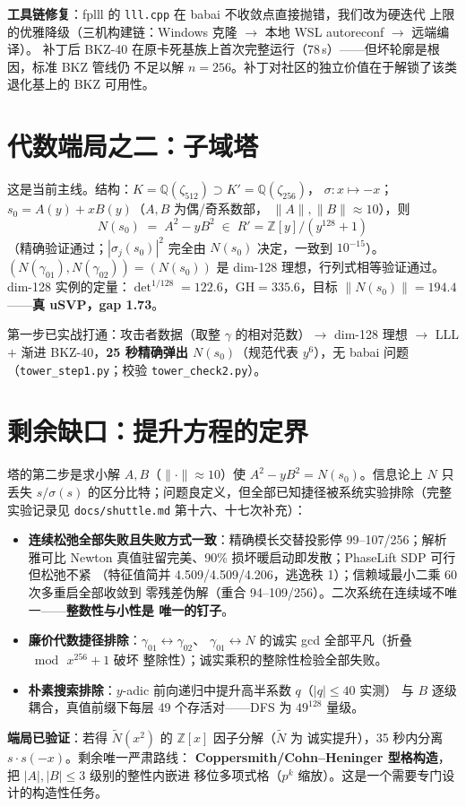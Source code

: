 \documentclass[UTF8,11pt,a4paper]{ctexart}
\newcommand{\code}[1]{\texttt{\small #1}}
\begin{document}
\textbf{工具链修复}：fplll 的 \code{lll.cpp} 在 babai 不收敛点直接抛错，我们改为硬迭代
上限的优雅降级（三机构建链：Windows 克隆 $\to$ 本地 WSL autoreconf $\to$ 远端编译）。
补丁后 BKZ-40 在原卡死基族上首次完整运行（78\,s）——但坏轮廓是根因，标准 BKZ 管线仍
不足以解 $n = 256$。补丁对社区的独立价值在于解锁了该类退化基上的 BKZ 可用性。

\section{代数端局之二：子域塔}

这是当前主线。结构：$K = \mathbb{Q}(\zeta_{512}) \supset K' = \mathbb{Q}(\zeta_{256})$，
$\sigma\colon x \mapsto -x$；$s_0 = A(y) + x B(y)$（$A, B$ 为偶/奇系数部，
$\|A\|, \|B\| \approx 10$），则
\[
N(s_0) \;=\; A^2 - y B^2 \;\in\; R' = \mathbb{Z}[y]/(y^{128}+1)
\]
（精确验证通过；$|\sigma_j(s_0)|^2$ 完全由 $N(s_0)$ 决定，一致到 $10^{-15}$）。
$(N(\gamma_{01}), N(\gamma_{02})) = (N(s_0))$ 是 dim-128 理想，行列式相等验证通过。
dim-128 实例的定量：$\det^{1/128} = 122.6$，$\mathrm{GH} = 335.6$，目标
$\|N(s_0)\| = 194.4$——\textbf{真 uSVP，gap 1.73}。

第一步已实战打通：攻击者数据（取整 $\gamma$ 的相对范数）$\to$ dim-128 理想 $\to$
LLL $+$ 渐进 BKZ-40，\textbf{25 秒精确弹出 $N(s_0)$}（规范代表 $y^6$），无 babai 问题
（\code{tower\_step1.py}；校验 \code{tower\_check2.py}）。

\section{剩余缺口：提升方程的定界}

塔的第二步是求小解 $A, B$（$\|\cdot\| \approx 10$）使 $A^2 - yB^2 = N(s_0)$。信息论上
$N$ 只丢失 $s/\sigma(s)$ 的区分比特；问题良定义，但全部已知捷径被系统实验排除（完整
实验记录见 \code{docs/shuttle.md} 第十六、十七次补充）：
\begin{itemize}
\item \textbf{连续松弛全部失败且失败方式一致}：精确模长交替投影停 99--107/256；解析
  雅可比 Newton 真值驻留完美、90\% 损坏暖启动即发散；PhaseLift SDP 可行但松弛不紧
  （特征值简并 4.509/4.509/4.206，逃逸秩 1）；信赖域最小二乘 60 次多重启全部收敛到
  零残差伪解（重合 94--109/256）。二次系统在连续域不唯一——\textbf{整数性与小性是
  唯一的钉子}。
\item \textbf{廉价代数捷径排除}：$\gamma_{01} \leftrightarrow \gamma_{02}$、
  $\gamma_{01} \leftrightarrow N$ 的诚实 gcd 全部平凡（折叠 $\bmod\, x^{256}+1$ 破坏
  整除性）；诚实乘积的整除性检验全部失败。
\item \textbf{朴素搜索排除}：$y$-adic 前向递归中提升高半系数 $q$（$|q| \le 40$ 实测）
  与 $B$ 逐级耦合，真值前缀下每层 49 个存活对——DFS 为 $49^{128}$ 量级。
\end{itemize}
\textbf{端局已验证}：若得 $\tilde N(x^2)$ 的 $\mathbb{Z}[x]$ 因子分解（$\tilde N$ 为
诚实提升），35 秒内分离 $s \cdot s(-x)$。剩余唯一严肃路线：
\textbf{Coppersmith/Cohn--Heninger 型格构造}，把 $|A|, |B| \le 3$ 级别的整性内嵌进
移位多项式格（$p^k$ 缩放）。这是一个需要专门设计的构造性任务。
\end{document}
